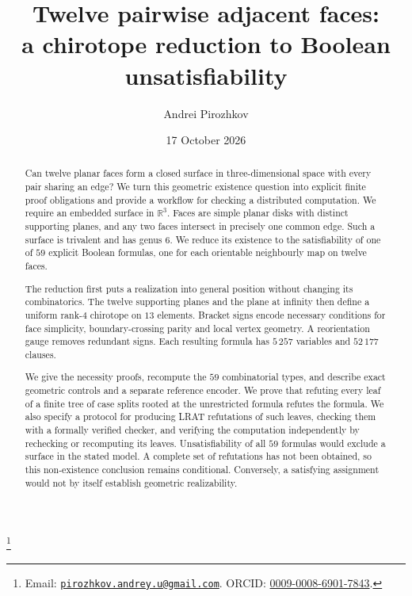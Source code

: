 \documentclass[11pt,reqno]{amsart}
\theoremstyle{plain}
\theoremstyle{definition}
\newcommand{\RR}{\mathbb{R}}
\begin{document}
\title[Twelve pairwise adjacent faces]{Twelve pairwise adjacent faces:\\ a chirotope reduction to Boolean unsatisfiability}

\author[Twelve pairwise adjacent faces]{Andrei Pirozhkov}
\thanks{Email: \href{mailto:pirozhkov.andrey.u@gmail.com}{\texttt{pirozhkov.andrey.u@gmail.com}}.
  ORCID: \href{https://orcid.org/0009-0008-6901-7843}{0009-0008-6901-7843}.}
\date{17 October 2026}


\begin{abstract}
Can twelve planar faces form a closed surface in three-dimensional space with every
pair sharing an edge? We turn this geometric existence question into explicit finite
proof obligations and provide a workflow for checking a distributed computation.
We require an embedded surface in $\RR^3$. Faces are simple planar disks with distinct supporting planes, and any two
faces intersect in precisely one common edge. Such a surface is trivalent and has
genus $6$. We reduce its existence to the satisfiability of one of $59$ explicit
Boolean formulas, one for each orientable neighbourly map on twelve faces.

The reduction first puts a realization into general position without changing its
combinatorics. The twelve supporting planes and the plane at infinity then define
a uniform rank-$4$ chirotope on $13$ elements. Bracket signs encode necessary
conditions for face simplicity, boundary-crossing parity and local vertex geometry.
A reorientation gauge removes redundant signs. Each resulting formula has
$5\,257$ variables and $52\,177$ clauses.

We give the necessity proofs, recompute the $59$ combinatorial types, and describe
exact geometric controls and a separate reference encoder. We prove that refuting
every leaf of a finite tree of case splits rooted at the unrestricted formula refutes
the formula. We also specify a protocol for producing LRAT refutations of such leaves,
checking them with a formally verified checker, and verifying the computation
independently by rechecking or recomputing its leaves.
Unsatisfiability of all $59$ formulas would exclude a surface in the
stated model. A complete set of refutations has not been obtained, so this
non-existence conclusion remains conditional. Conversely, a satisfying assignment
would not by itself establish geometric realizability.
\end{abstract}
\end{document}
